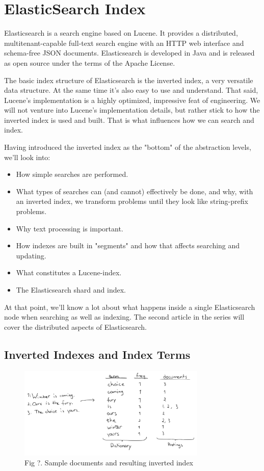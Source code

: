 \section{ElasticSearch Index}

Elasticsearch is a search engine based on Lucene. It provides a distributed, multitenant-capable full-text search engine with an HTTP web interface and schema-free JSON documents. Elasticsearch is developed in Java and is released as open source under the terms of the Apache License.\cite{wiki_elastic}

The basic index structure of Elasticsearch is the inverted index, a very versatile data structure. At the same time it's also easy to use and understand. That said, Lucene's implementation is a highly optimized, impressive feat of engineering. We will not venture into Lucene's implementation details, but rather stick to how the inverted index is used and built. That is what influences how we can search and index.\cite{art_elastic}

Having introduced the inverted index as the "bottom" of the abstraction levels, we'll look into:
\begin{itemize}
\item How simple searches are performed.
\item What types of searches can (and cannot) effectively be done, and why, with an inverted index, we transform problems until they look like string-prefix problems.
\item Why text processing is important.
\item How indexes are built in "segments" and how that affects searching and updating.
\item What constitutes a Lucene-index.
\item The Elasticsearch shard and index.
\end{itemize}

At that point, we'll know a lot about what happens inside a single Elasticsearch node when searching as well as indexing. The second article in the series will cover the distributed aspects of Elasticsearch.

\subsection*{Inverted Indexes and Index Terms}

\begin{figure}
\centering
\includegraphics[width=0.8\textwidth]{img/elastic.png}
\caption{Fig ?. Sample documents and resulting inverted index}
\label{Fig.1}
\end{figure}



